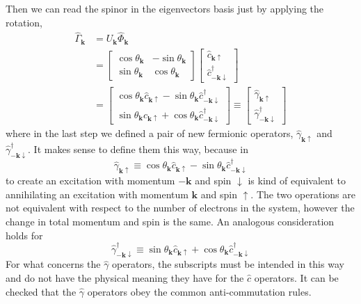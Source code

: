 Then we can read the spinor in the eigenvectors basis just by applying the rotation,
\[
\begin{aligned}
	\hat{\Gamma}_\mathbf{k} &= U_\mathbf{k} \hat{\Phi}_\mathbf{k} \\
	&= \begin{bmatrix}
		\cos \theta_\mathbf{k} & -\sin \theta_\mathbf{k} \\
		\sin \theta_\mathbf{k} & \cos \theta_\mathbf{k}
	\end{bmatrix} \begin{bmatrix}
		\hat{c}_{\mathbf{k}\uparrow} \\
		\hat{c}_{-\mathbf{k}\downarrow}^\dagger
	\end{bmatrix} \\
	&= \begin{bmatrix}
		\cos \theta_\mathbf{k} \hat{c}_{\mathbf{k}\uparrow} -\sin \theta_\mathbf{k} \hat{c}_{-\mathbf{k}\downarrow}^\dagger \\
		\sin \theta_\mathbf{k} \hat{c}_{\mathbf{k}\uparrow} + \cos \theta_\mathbf{k} \hat{c}_{-\mathbf{k}\downarrow}^\dagger
	\end{bmatrix} \equiv \begin{bmatrix}
		\hat{\gamma}_{\mathbf{k}\uparrow} \\
		\hat{\gamma}_{-\mathbf{k}\downarrow}^\dagger
	\end{bmatrix}
\end{aligned}
\]
where in the last step we defined a pair of new fermionic operators, $\hat{\gamma}_{\mathbf{k}\uparrow}$ and $\hat{\gamma}_{-\mathbf{k}\downarrow}^\dagger$. It makes sense to define them this way, because in
\[
	\hat{\gamma}_{\mathbf{k}\uparrow} \equiv \cos \theta_\mathbf{k} \hat{c}_{\mathbf{k}\uparrow} -\sin \theta_\mathbf{k} \hat{c}_{-\mathbf{k}\downarrow}^\dagger
\]
to create an excitation with momentum $-\mathbf{k}$ and spin $\downarrow$ is kind of equivalent to annihilating an excitation with momentum $\mathbf{k}$ and spin $\uparrow$. The two operations are not equivalent with respect to the number of electrons in the system, however the change in total momentum and spin is the same. An analogous consideration holds for
\[
	\hat{\gamma}_{-\mathbf{k}\downarrow}^\dagger \equiv \sin \theta_\mathbf{k} \hat{c}_{\mathbf{k}\uparrow} + \cos \theta_\mathbf{k} \hat{c}_{-\mathbf{k}\downarrow}^\dagger
\]
For what concerns the $\hat{\gamma}$ operators, the subscripts must be intended in this way and do not have the physical meaning they have for the $\hat{c}$ operators. It can be checked that the $\hat{\gamma}$ operators obey the common anti-commutation rules.
